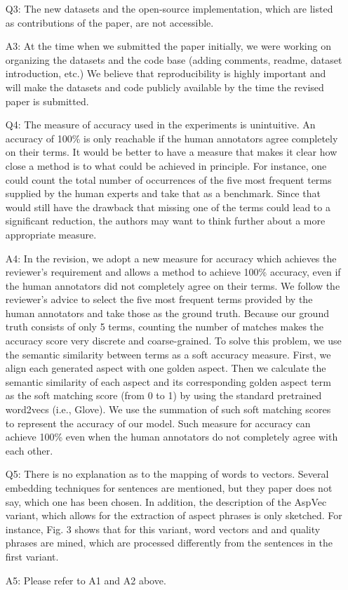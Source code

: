 \begin{itemize}
\item [Q3:] 
The new datasets and the open-source implementation, which are listed as contributions of the paper, are not accessible.
\item [A3:] At the time when we submitted the paper initially,
we were working on organizing the datasets and the code base (adding comments, readme, dataset introduction, etc.) We believe that reproducibility is highly important and will make the datasets and code publicly available by the time
the revised paper is submitted.

\item [Q4:] 
The measure of accuracy used in the experiments is unintuitive. An accuracy of 100\% is only reachable if the human annotators agree completely on their terms. It would be better to have a measure that makes it clear	how close a method is to what could be achieved in principle.
For instance, one could count the total number of occurrences of the five most frequent terms supplied by the human experts and take that as a benchmark. 	Since that would still have the drawback that missing one of the	terms could lead to a significant reduction, the authors may want to think further about a more appropriate measure.
\item [A4:] In the revision, we adopt a new measure for accuracy which 
achieves the reviewer's requirement and allows a method to achieve 100\% 
accuracy, even if the human annotators did not completely agree on their terms. We follow the reviewer’s advice to select the five most frequent terms 
provided by the human annotators and take those as the ground truth. 
Because our ground truth consists of only 5 terms, counting the 
number of matches makes the accuracy score very discrete and coarse-grained.
To solve this problem, we use the semantic similarity between terms as a
soft accuracy measure. First, we align each generated aspect with one golden 
aspect. Then we calculate the semantic similarity of each aspect and its 
corresponding golden aspect term as the soft matching score (from 0 to 1) 
by using the standard pretrained word2vecs (i.e., Glove).
We use the summation of such soft matching scores to represent the 
accuracy of our model.
Such measure for accuracy can achieve 100\% even when the human annotators 
do not completely agree with each other.
	
	
\item [Q5:] There is no explanation as to the mapping of words to vectors. Several embedding techniques for sentences are mentioned, but they paper does not say, which one has been chosen. In addition, the description of the AspVec variant, which allows for the extraction of aspect phrases is only sketched. For instance, Fig. 3 shows that for this variant, word vectors and and quality phrases are mined, which are processed differently from the sentences in the first variant. 
\item [A5:] Please refer to A1 and A2 above.
	

\end{itemize}
